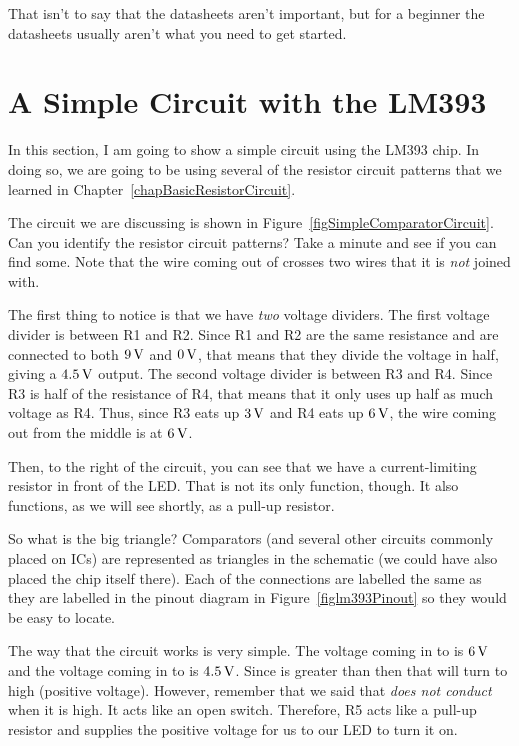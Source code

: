 That isn't to say that the datasheets aren't important, but for a beginner the datasheets usually aren't what you need to get started.

\section{A Simple Circuit with the LM393}

In this section, I am going to show a simple circuit using the LM393 chip.
In doing so, we are going to be using several of the resistor circuit patterns that we learned in Chapter~\ref{chapBasicResistorCircuit}.


The circuit we are discussing is shown in Figure~\ref{figSimpleComparatorCircuit}.
Can you identify the resistor circuit patterns?  
Take a minute and see if you can find some.
Note that the wire coming out of  crosses two wires that it is \emph{not} joined with.

The first thing to notice is that we have \emph{two} voltage dividers.
The first voltage divider is between R1 and R2.
Since R1 and R2 are the same resistance and are connected to both $9\,\si{\volt}$ and $0\,\si{\volt}$, that means that they divide the voltage in half, giving a $4.5\,\si{\volt}$ output.
The second voltage divider is between R3 and R4.
Since R3 is half of the resistance of R4, that means that it only uses up half as much voltage as R4.  
Thus, since R3 eats up $3\,\si{\volt}$ and R4 eats up $6\,\si{\volt}$, the wire coming out from the middle is at $6\,\si{\volt}$.

Then, to the right of the circuit, you can see that we have a current-limiting resistor in front of the LED.
That is not its only function, though.
It also functions, as we will see shortly, as a pull-up resistor.

So what is the big triangle?
Comparators (and several other circuits commonly placed on ICs) are represented as triangles in the schematic (we could have also placed the chip itself there).
Each of the connections are labelled the same as they are labelled in the pinout diagram in Figure~\ref{figlm393Pinout} so they would be easy to locate.

The way that the circuit works is very simple.
The voltage coming in to  is $6\,\si{\volt}$ and the voltage coming in to  is $4.5\,\si{\volt}$.
Since  is greater than  then that will turn  to high (positive voltage).
However, remember that we said that  \emph{does not conduct} when it is high.
It acts like an open switch.
Therefore, R5 acts like a pull-up resistor and supplies the positive voltage for us to our LED to turn it on.

